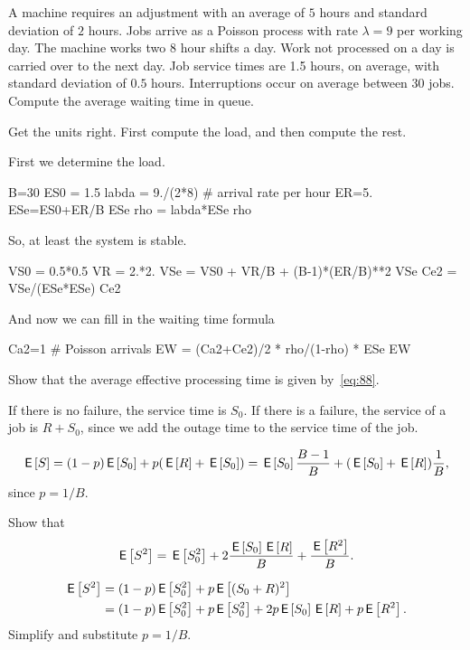 \begin{exercise}
 A machine requires an adjustment with an average of $5$ hours and standard deviation of $2$ hours.
 Jobs arrive as a Poisson process with rate $\lambda=9$ per working day.
 The machine works two $8$ hour shifts a day.
 Work not processed on a day is carried over to the next day.
 Job service times are 1.5 hours, on average, with standard deviation of $0.5$ hours.
 Interruptions occur on average between $30$ jobs.
 Compute the average waiting time in queue.
\begin{hint}
 Get the units right. First compute the load, and then compute the rest.
\end{hint}
\begin{solution}
 First we determine the load. 
 \begin{pyconsole}
B=30
ES0 = 1.5
labda = 9./(2*8) # arrival rate per hour
ER=5.
ESe=ES0+ER/B
ESe
rho = labda*ESe
rho
 \end{pyconsole}
So, at least the system is stable.

\begin{pyconsole}
VS0 = 0.5*0.5
VR = 2.*2.
VSe = VS0 + VR/B + (B-1)*(ER/B)**2
VSe
Ce2 = VSe/(ESe*ESe)
Ce2
\end{pyconsole}

And now we can fill in the waiting time formula
\begin{pyconsole}
Ca2=1 # Poisson arrivals
EW = (Ca2+Ce2)/2 * rho/(1-rho) * ESe
EW 
\end{pyconsole}
\end{solution}
\end{exercise}

\begin{exercise}
Show that the average effective processing time is given by~\cref{eq:88}. 
\begin{hint}
If there is no failure, the service time is $S_0$. If there is a failure, the service of a job is $R + S_0$, since we add the outage time to the service time of the job. 
\end{hint}
\begin{solution}
 \begin{equation*}
 \,\mathsf{E}\left[S\right] = (1-p)\,\mathsf{E}\left[S_0\right] + p (\,\mathsf{E}\left[R\right] + \,\mathsf{E}\left[S_0\right]) = \,\mathsf{E}\left[S_0\right] \frac{B-1}B + (\,\mathsf{E}\left[S_0\right] + \,\mathsf{E}\left[R\right]) \frac 1B,
 \end{equation*}
since $p=1/B$. 
\end{solution}
\end{exercise}


\begin{extra}
 Show that
 \begin{equation*}
 \,\mathsf{E}\left[S^2\right] = \,\mathsf{E}\left[S_0^2\right] + 2\frac{\,\mathsf{E}\left[S_0\right]\,\mathsf{E}\left[R\right]} B + \frac{\,\mathsf{E}\left[R^2\right]}B.
 \end{equation*}
\begin{solution}
 \begin{align*}
 \,\mathsf{E}\left[S^2\right] 
&= (1-p) \,\mathsf{E}\left[S_0^2\right] + p \,\mathsf{E}\left[(S_0+R)^2\right]\\
&= (1-p) \,\mathsf{E}\left[S_0^2\right] + p \,\mathsf{E}\left[S_0^2\right] + 2 p \,\mathsf{E}\left[S_0\right] \,\mathsf{E}\left[R\right] + p \,\mathsf{E}\left[R^2\right]. 
 \end{align*}
 Simplify and substitute $p=1/B$. 
\end{solution}
\end{extra}

